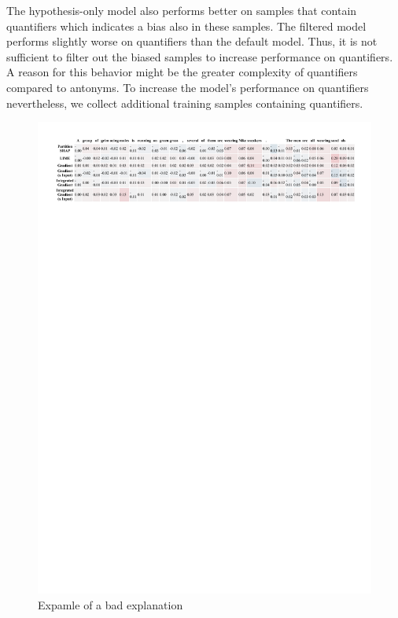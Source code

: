 The hypothesis-only model also performs better on samples that contain quantifiers which indicates a bias also in these samples. The filtered model performs slightly worse on quantifiers than the default model. Thus, it is not sufficient to filter out the biased samples to increase performance on quantifiers. A reason for this behavior might be the greater complexity of quantifiers compared to antonyms. To increase the model's performance on quantifiers nevertheless, we collect additional training samples containing quantifiers.

\begin{figure}[h!]
    \centering
    \includegraphics[width=\textwidth]{./images/ferret_sample.pdf}
    \caption{Expamle of a bad explanation}
    \label{fig:ferret-sample}
\end{figure}

\FloatBarrier{}

